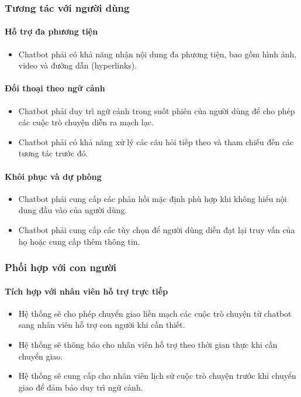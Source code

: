 \subsubsection{Tương tác với người dùng}

\paragraph{Hỗ trợ đa phương tiện}
\begin{itemize}
    \item Chatbot phải có khả năng nhận nội dung đa phương tiện, bao gồm hình ảnh, video và đường dẫn (hyperlinks).
\end{itemize}

\paragraph{Đối thoại theo ngữ cảnh}
\begin{itemize}
    \item Chatbot phải duy trì ngữ cảnh trong suốt phiên của người dùng để cho phép các cuộc trò chuyện diễn ra mạch lạc.
    \item Chatbot phải có khả năng xử lý các câu hỏi tiếp theo và tham chiếu đến các tương tác trước đó.
\end{itemize}

\paragraph{Khôi phục và dự phòng}
\begin{itemize}
    \item Chatbot phải cung cấp các phản hồi mặc định phù hợp khi không hiểu nội dung đầu vào của người dùng.
    \item Chatbot phải cung cấp các tùy chọn để người dùng diễn đạt lại truy vấn của họ hoặc cung cấp thêm thông tin.
\end{itemize}

\subsubsection{Phối hợp với con người}

\paragraph{Tích hợp với nhân viên hỗ trợ trực tiếp}
\begin{itemize}
    \item Hệ thống sẽ cho phép chuyển giao liền mạch các cuộc trò chuyện từ chatbot sang nhân viên hỗ trợ con người khi cần thiết.
    \item Hệ thống sẽ thông báo cho nhân viên hỗ trợ theo thời gian thực khi cần chuyển giao.
    \item Hệ thống sẽ cung cấp cho nhân viên lịch sử cuộc trò chuyện trước khi chuyển giao để đảm bảo duy trì ngữ cảnh.
\end{itemize}

